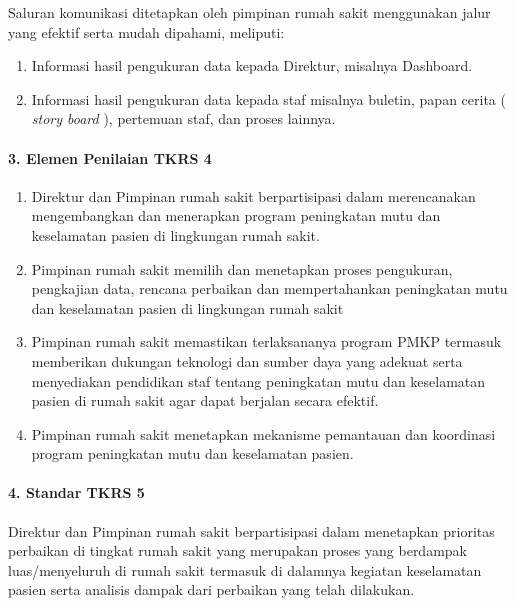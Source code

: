 \documentclass[
]{book}
\providecommand{\tightlist}{%
  \setlength{\itemsep}{0pt}\setlength{\parskip}{0pt}}
\begin{document}
Saluran komunikasi ditetapkan oleh pimpinan rumah sakit menggunakan jalur yang efektif serta mudah dipahami, meliputi:

\begin{enumerate}
\def\labelenumi{\alph{enumi}.}
\tightlist
\item
  Informasi hasil pengukuran data kepada Direktur, misalnya Dashboard.
\item
  Informasi hasil pengukuran data kepada staf misalnya buletin, papan cerita ( \emph{story board} ), pertemuan staf, dan proses lainnya.
\end{enumerate}

\hypertarget{elemen-penilaian-tkrs-4}{%
\paragraph*{3. Elemen Penilaian TKRS 4}\label{elemen-penilaian-tkrs-4}}

\begin{enumerate}
\def\labelenumi{\alph{enumi}.}
\tightlist
\item
  Direktur dan Pimpinan rumah sakit berpartisipasi dalam merencanakan mengembangkan dan menerapkan program peningkatan mutu dan keselamatan pasien di lingkungan rumah sakit.
\item
  Pimpinan rumah sakit memilih dan menetapkan proses pengukuran, pengkajian data, rencana perbaikan dan mempertahankan peningkatan mutu dan keselamatan pasien di lingkungan rumah sakit
\item
  Pimpinan rumah sakit memastikan terlaksananya program PMKP termasuk memberikan dukungan teknologi dan sumber daya yang adekuat serta menyediakan pendidikan staf tentang peningkatan mutu dan keselamatan pasien di rumah sakit agar dapat berjalan secara efektif.
\item
  Pimpinan rumah sakit menetapkan mekanisme pemantauan dan koordinasi program peningkatan mutu dan keselamatan pasien.
\end{enumerate}

\hypertarget{standar-tkrs-5}{%
\paragraph*{4. Standar TKRS 5}\label{standar-tkrs-5}}

Direktur dan Pimpinan rumah sakit berpartisipasi dalam menetapkan prioritas perbaikan di tingkat rumah sakit yang merupakan proses yang berdampak luas/menyeluruh di rumah sakit termasuk di dalamnya kegiatan keselamatan pasien serta analisis dampak dari perbaikan yang telah dilakukan.
\end{document}

